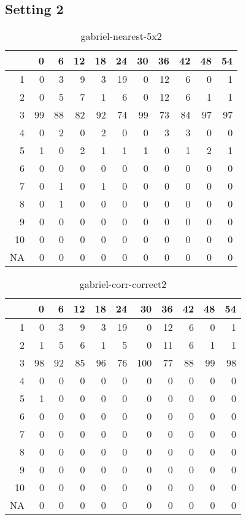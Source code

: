\documentclass[11pt]{article}
\begin{document}
\subsection{Setting 2}
\begin{table}[H]
\centering
\begin{tabular}{rrrrrrrrrrr}
  \hline
 & 0 & 6 & 12 & 18 & 24 & 30 & 36 & 42 & 48 & 54 \\ 
  \hline
1 & 0 & 3 & 9 & 3 & 19 & 0 & 12 & 6 & 0 & 1 \\ 
  2 & 0 & 5 & 7 & 1 & 6 & 0 & 12 & 6 & 1 & 1 \\ 
  3 & 99 & 88 & 82 & 92 & 74 & 99 & 73 & 84 & 97 & 97 \\ 
  4 & 0 & 2 & 0 & 2 & 0 & 0 & 3 & 3 & 0 & 0 \\ 
  5 & 1 & 0 & 2 & 1 & 1 & 1 & 0 & 1 & 2 & 1 \\ 
  6 & 0 & 0 & 0 & 0 & 0 & 0 & 0 & 0 & 0 & 0 \\ 
  7 & 0 & 1 & 0 & 1 & 0 & 0 & 0 & 0 & 0 & 0 \\ 
  8 & 0 & 1 & 0 & 0 & 0 & 0 & 0 & 0 & 0 & 0 \\ 
  9 & 0 & 0 & 0 & 0 & 0 & 0 & 0 & 0 & 0 & 0 \\ 
  10 & 0 & 0 & 0 & 0 & 0 & 0 & 0 & 0 & 0 & 0 \\ 
  NA & 0 & 0 & 0 & 0 & 0 & 0 & 0 & 0 & 0 & 0 \\ 
   \hline
\end{tabular}
\caption{gabriel-nearest-5x2} 
\end{table}
\begin{table}[H]
\centering
\begin{tabular}{rrrrrrrrrrr}
  \hline
 & 0 & 6 & 12 & 18 & 24 & 30 & 36 & 42 & 48 & 54 \\ 
  \hline
1 & 0 & 3 & 9 & 3 & 19 & 0 & 12 & 6 & 0 & 1 \\ 
  2 & 1 & 5 & 6 & 1 & 5 & 0 & 11 & 6 & 1 & 1 \\ 
  3 & 98 & 92 & 85 & 96 & 76 & 100 & 77 & 88 & 99 & 98 \\ 
  4 & 0 & 0 & 0 & 0 & 0 & 0 & 0 & 0 & 0 & 0 \\ 
  5 & 1 & 0 & 0 & 0 & 0 & 0 & 0 & 0 & 0 & 0 \\ 
  6 & 0 & 0 & 0 & 0 & 0 & 0 & 0 & 0 & 0 & 0 \\ 
  7 & 0 & 0 & 0 & 0 & 0 & 0 & 0 & 0 & 0 & 0 \\ 
  8 & 0 & 0 & 0 & 0 & 0 & 0 & 0 & 0 & 0 & 0 \\ 
  9 & 0 & 0 & 0 & 0 & 0 & 0 & 0 & 0 & 0 & 0 \\ 
  10 & 0 & 0 & 0 & 0 & 0 & 0 & 0 & 0 & 0 & 0 \\ 
  NA & 0 & 0 & 0 & 0 & 0 & 0 & 0 & 0 & 0 & 0 \\ 
   \hline
\end{tabular}
\caption{gabriel-corr-correct2} 
\end{table}
\end{document}
